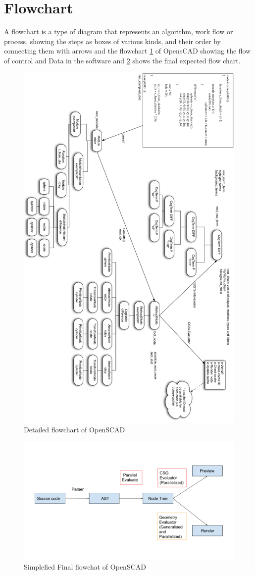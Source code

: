 \section{Flowchart}
A flowchart is a type of diagram that represents an algorithm, work flow or process, showing the steps as boxes of various kinds, and their order by connecting them with arrows
and the flowchart \ref{fig:openscad-compile} of OpensCAD showing the flow of control and Data in the software and \ref{fig:finalflow} shows the final expected flow chart.

\begin{figure}[H]
\centering
\includegraphics[height=1.37\columnwidth]{images/OpenSCAD-compile.png}
\caption{Detailed flowchart of OpenSCAD}
\label{fig:openscad-compile}
\end{figure}

\begin{figure}[H]
\centering
\includegraphics[width=1\linewidth]{images/finalflow}
\caption{Simplefied Final flowchat of OpenSCAD}
\label{fig:finalflow}
\end{figure}


